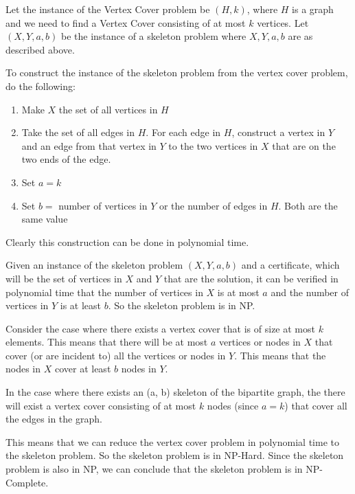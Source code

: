 \documentclass[paper=a4, fontsize=11pt]{scrartcl} %
\numberwithin{figure}{section} %
\numberwithin{table}{section} %
\begin{document}
\begin{enumerate}
Let the instance of the Vertex Cover problem be $(H, k)$, where $H$ is a graph and we need to find a Vertex Cover consisting of at most $k$ vertices. Let $(X, Y, a, b)$ be the instance of a skeleton problem where $X, Y, a, b$ are as described above. 

To construct the instance of the skeleton problem from the vertex cover problem, do the following:

\begin{enumerate}

\item Make $X$ the set of all vertices in $H$

\item Take the set of all edges in $H$. For each edge in $H$, construct a vertex in $Y$ and an edge from that vertex in $Y$ to the two vertices in $X$ that are on the two ends of the edge.

\item Set $a = k$

\item Set $b =$ number of vertices in $Y$ or the number of edges in $H$. Both are the same value

\end{enumerate}

Clearly this construction can be done in polynomial time. 

Given an instance of the skeleton problem $(X, Y, a, b)$ and a certificate, which will be the set of vertices in $X$ and $Y$ that are the solution, it can be verified in polynomial time that the number of vertices in $X$ is at most $a$ and the number of vertices in $Y$ is at least $b$. So the skeleton problem is in NP.

Consider the case where there exists a vertex cover that is of size at most $k$ elements. This means that there will be at most $a$ vertices or nodes in $X$ that cover (or are incident to) all the vertices or nodes in $Y$. This means that the nodes in $X$ cover at least $b$ nodes in $Y$.

In the case where there exists an (a, b) skeleton of the bipartite graph, the there will exist a vertex cover consisting of at most $k$ nodes (since $a=k$) that cover all the edges in the graph.

This means that we can reduce the vertex cover problem in polynomial time to the skeleton problem. So the skeleton problem is in NP-Hard. Since the skeleton problem is also in NP, we can conclude that the skeleton problem is in NP-Complete.


\end{enumerate}
\end{document}

